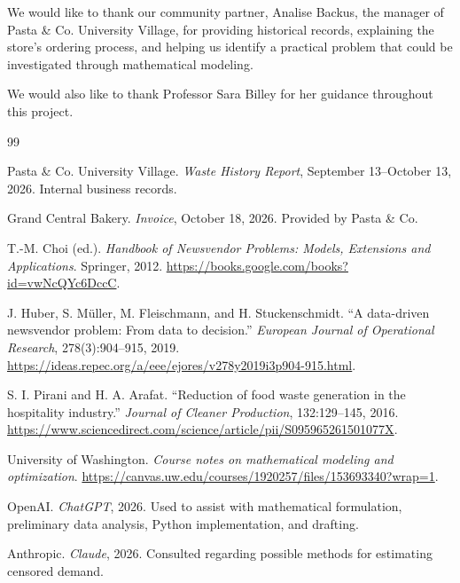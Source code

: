 \documentclass[11pt]{article}
\begin{document}
We would like to thank our community partner, Analise Backus, the manager of Pasta \& Co. University Village, for providing historical records, explaining the store's ordering process, and helping us identify a practical problem that could be investigated through mathematical modeling.

We would also like to thank Professor Sara Billey for her guidance throughout this project.

\begin{thebibliography}{99}

Pasta \& Co. University Village. \emph{Waste History Report}, September 13--October 13, 2026. Internal business records.

Grand Central Bakery. \emph{Invoice}, October 18, 2026. Provided by Pasta \& Co.

T.-M. Choi (ed.). \emph{Handbook of Newsvendor Problems: Models, Extensions and Applications}. Springer, 2012. \url{https://books.google.com/books?id=vwNcQYc6DccC}.

J. Huber, S. M\"uller, M. Fleischmann, and H. Stuckenschmidt. ``A data-driven newsvendor problem: From data to decision.'' \emph{European Journal of Operational Research}, 278(3):904--915, 2019. \url{https://ideas.repec.org/a/eee/ejores/v278y2019i3p904-915.html}.

S. I. Pirani and H. A. Arafat. ``Reduction of food waste generation in the hospitality industry.'' \emph{Journal of Cleaner Production}, 132:129--145, 2016. \url{https://www.sciencedirect.com/science/article/pii/S095965261501077X}.

University of Washington. \emph{Course notes on mathematical modeling and optimization}. \url{https://canvas.uw.edu/courses/1920257/files/153693340?wrap=1}.

OpenAI. \emph{ChatGPT}, 2026. Used to assist with mathematical formulation, preliminary data analysis, Python implementation, and drafting.

Anthropic. \emph{Claude}, 2026. Consulted regarding possible methods for estimating censored demand.

\end{thebibliography}

\end{document}
